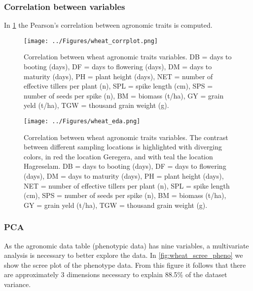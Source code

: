 \documentclass[a4paper,onecolumn,10pt]{article}
\begin{document}
\subsubsection{Correlation between variables}

In \cref{fig:wheat_corr} the Pearson's correlation between agronomic traits is computed.

\begin{figure}[H]
    \centering
    \texttt{[image: ../Figures/wheat\_corrplot.png]}
    \caption{
        Correlation between wheat agronomic traits variables.
        DB = days to booting (days),
        DF = days to flowering (days),
        DM = days to maturity (days),
        PH = plant height (days),
        NET = number of effective tillers per plant (n),
        SPL = spike length (cm),
        SPS = number of seeds per spike (n),
        BM = biomass (t/ha),
        GY = grain yeld (t/ha),
        TGW = thousand grain weight (g).
    }
    \label{fig:wheat_corr}
\end{figure}


\begin{figure}[H]
    \centering
    \texttt{[image: ../Figures/wheat\_eda.png]}
    \caption{
        Correlation between wheat agronomic traits variables.
        The contrast between different sampling locations is highlighted with diverging colors, in red the location Geregera, and with teal the location Hagreselam.
        DB = days to booting (days),
        DF = days to flowering (days),
        DM = days to maturity (days),
        PH = plant height (days),
        NET = number of effective tillers per plant (n),
        SPL = spike length (cm),
        SPS = number of seeds per spike (n),
        BM = biomass (t/ha),
        GY = grain yeld (t/ha),
        TGW = thousand grain weight (g).
    }
    \label{fig:wheat_eda}
\end{figure}


\subsubsection{PCA}

As the agronomic data table (phenotypic data) has nine variables, a multivariate analysis is necessary to better explore the data.
In \cref{fig:wheat_scree_pheno} we show the scree plot of the phenotype data.
From this figure it follows that there are approximately 3 dimensions necessary to explain 88.5\% of the dataset variance.
\end{document}

